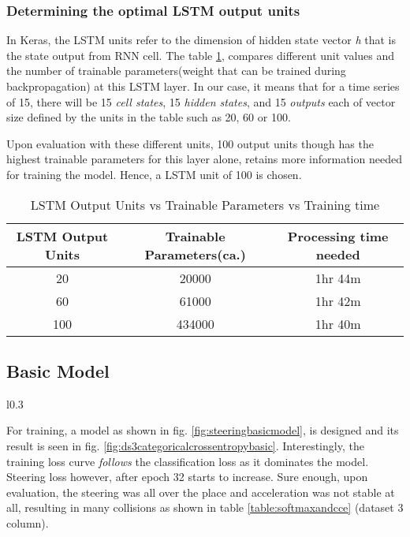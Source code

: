 \subsubsection*{Determining the optimal LSTM output units}
In Keras, the LSTM units refer to the dimension of hidden state vector \textit{h} that is the state output from RNN cell.
The table \ref{table:unitsvstime}, compares different unit values and the number of
trainable parameters(weight that can be trained during backpropagation) at this LSTM
layer.
In our case, it means that for a time series of 15, there will be 15 \textit{cell states},
15 \textit{hidden states}, and 15 \textit{outputs} each of vector size defined by the
units in the table such as 20, 60 or 100.

Upon evaluation with these different units, 100 output units though has the highest
trainable parameters for this layer alone, retains more information needed for training
the model.  Hence, a LSTM unit of 100 is chosen.
\begin{table}[!ht]
    \centering
\begin{tabular}{ccc}
    \toprule
    LSTM Output Units & Trainable Parameters(ca.) & Processing time needed \\\midrule
    20 & 20000 & 1hr 44m  \\
    60 & 61000 & 1hr 42m \\
    100 & 434000  & 1hr 40m \\\bottomrule
\end{tabular}
\caption{LSTM Output Units vs Trainable Parameters vs Training time}
\label{table:unitsvstime}
\end{table}
\newpage
\subsection{Basic Model}
\begin{wrapfigure}{l}{0.3\textwidth}
	\centering
    \def\svgwidth{0.2\textwidth}
    \caption{Basic model}
    \label{fig:steeringbasicmodel}
    \vspace*{-0.41in}
\end{wrapfigure}

For training, a model as shown in fig. \ref{fig:steeringbasicmodel}, is designed and its
result is seen in fig. \ref{fig:ds3categoricalcrossentropybasic}. Interestingly, the
training loss curve \textit{follows} the classification loss as it dominates the model. Steering
loss however, after epoch 32 starts to increase. Sure enough, upon evaluation,
the steering was all over the place and acceleration was not stable at all, resulting in
many collisions as shown in table \ref{table:softmaxandcce} (dataset 3 column).

